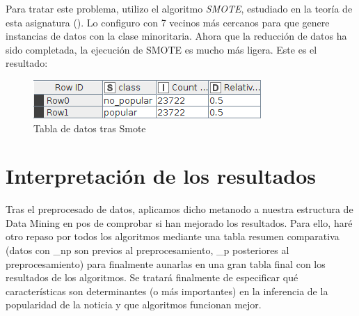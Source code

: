 Para tratar este problema, utilizo el algoritmo \textit{SMOTE}, estudiado en la teoría de esta asignatura (\cite{smote}). Lo configuro con 7 vecinos más cercanos para que genere instancias de datos con la clase minoritaria. Ahora que la reducción de datos ha sido completada, la ejecución de SMOTE es mucho más ligera. Este es el resultado:

\begin{figure}[H] %
	\centering
	\includegraphics[scale=0.6]{b-dat.png}  %
	\caption{Tabla de datos tras Smote} 
	\label{fig:hist-b-data}
\end{figure}

\newpage


\section{Interpretación de los resultados}

Tras el preprocesado de datos, aplicamos dicho metanodo a nuestra estructura de Data Mining en pos de comprobar si han mejorado los resultados. Para ello, haré otro repaso por todos los algoritmos mediante una tabla resumen comparativa (datos con \_np son previos al preprocesamiento, \_p posteriores al preprocesamiento) para finalmente aunarlas en una gran tabla final con los resultados de los algoritmos. Se tratará finalmente de especificar qué características son determinantes (o más importantes) en la inferencia de la popularidad de la noticia y que algoritmos funcionan mejor.


